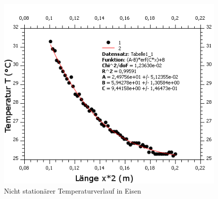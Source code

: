 \documentclass[12pt,a4paper]{article}
\begin{document}
\begin{figure}[H]
	\centering
	\includegraphics[scale=7]{./BilderCorrect/nicht_stationaer_temp_verlauf.png}
	\caption{Nicht stationärer Temperaturverlauf in Eisen}
	\label{fig:stat_verlauf}
\end{figure}
\end{document}
